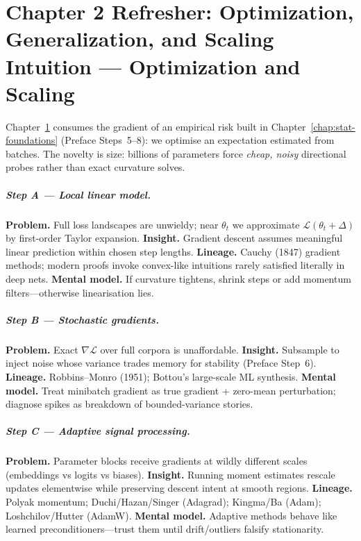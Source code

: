 \chapter{Chapter 2 Refresher: Optimization, Generalization, and Scaling Intuition --- Optimization and Scaling}
\label{chap:optimization}

\scenelabel
Chapter~\ref{chap:optimization} consumes the gradient of an empirical risk built in Chapter~\ref{chap:stat-foundations} (Preface Steps~5--8): we optimise an expectation estimated from batches. The novelty is size: billions of parameters force \emph{cheap, noisy} directional probes rather than exact curvature solves.

\paragraph{Step A --- Local linear model.}
\textbf{Problem.} Full loss landscapes are unwieldy; near $\theta_t$ we approximate $\mathcal{L}(\theta_t+\Delta)$ by first-order Taylor expansion.
\textbf{Insight.} Gradient descent assumes meaningful linear prediction within chosen step lengths.
\textbf{Lineage.} Cauchy (1847) gradient methods; modern proofs invoke convex-like intuitions rarely satisfied literally in deep nets.
\textbf{Mental model.} If curvature tightens, shrink steps or add momentum filters---otherwise linearisation lies.

\paragraph{Step B --- Stochastic gradients.}
\textbf{Problem.} Exact $\nabla\mathcal{L}$ over full corpora is unaffordable.
\textbf{Insight.} Subsample to inject noise whose variance trades memory for stability (Preface Step~6).
\textbf{Lineage.} Robbins--Monro (1951); Bottou's large-scale ML synthesis.
\textbf{Mental model.} Treat minibatch gradient as true gradient + zero-mean perturbation; diagnose spikes as breakdown of bounded-variance stories.

\paragraph{Step C --- Adaptive signal processing.}
\textbf{Problem.} Parameter blocks receive gradients at wildly different scales (embeddings vs logits vs biases).
\textbf{Insight.} Running moment estimates rescale updates elementwise while preserving descent intent at smooth regions.
\textbf{Lineage.} Polyak momentum; Duchi/Hazan/Singer (Adagrad); Kingma/Ba (Adam); Loshchilov/Hutter (AdamW).
\textbf{Mental model.} Adaptive methods behave like learned preconditioners---trust them until drift/outliers falsify stationarity.

